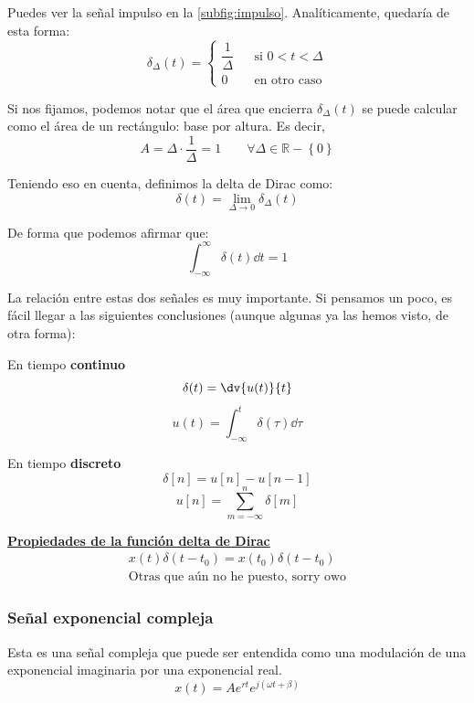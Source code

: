 \documentclass[a4paper]{book}
\begin{document}
Puedes ver la señal impulso en la \autoref{subfig:impulso}. Analíticamente, quedaría de esta forma: \[\delta _{\Delta}(t) = \left\{ \begin{matrix}
		\dfrac{1}{\Delta} &  & \text{si }0<t<\Delta \\[12pt]
		0                 &  & \text{en otro caso}
	\end{matrix} \right.\]

Si nos fijamos, podemos notar que el área que encierra $\delta _\Delta (t)$ se puede calcular como el área de un rectángulo: base por altura. Es decir, \[A= \Delta\cdot \frac{1}{\Delta} = 1 \qquad \forall \Delta \in \mathbb{R} -\left\{ 0 \right\} \]

Teniendo eso en cuenta, definimos la delta de Dirac como: \[\delta (t) = \lim_{\Delta \to 0}{\delta _{\Delta} (t)}\]

De forma que podemos afirmar que:
\[\int_{-\infty}^\infty{\delta (t)\dd t} = 1\]


\begin{nota}
	\label{relacion_delta_escalon}
	La relación entre estas dos señales es muy importante. Si pensamos un poco, es fácil llegar a las siguientes conclusiones (aunque algunas ya las hemos visto, de otra forma):
	\begin{multicols}{2}
		\centering
		En tiempo \textbf{continuo}
		\[\delta (t) = \dv{u(t)}{t} \]
		\[u(t) = \int_{-\infty}^{t}{\delta (\tau ) \dd \tau }\]

		En tiempo \textbf{discreto}
		\[\delta [n] = u[n] - u[n-1]\]
		\[u[n] = \sum^{n}_{m=-\infty}{\delta [m]}\]
	\end{multicols}
\end{nota}

\begin{center}
	\underline{\textbf{Propiedades de la función delta de Dirac}}
	\begin{align*}
		x(t)\delta (t-t_0) = x(t_0)\delta(t-t_0) \\
		\text{Otras que aún no he puesto, sorry owo}
	\end{align*}
\end{center}

\subsubsection{Señal exponencial compleja}
Esta es una señal compleja que puede ser entendida como una modulación de una exponencial imaginaria por una exponencial real. \[x(t) = Ae^{rt}e^{j\left( \omega t + \beta \right)}\]
\end{document}
